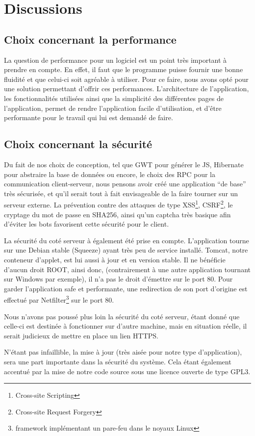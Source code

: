 \chapter{Discussions}
\section{Choix concernant la performance}
La question de performance pour un logiciel est un point très important à prendre en compte. En effet, il faut que le programme puisse fournir une bonne fluidité et que celui-ci soit agréable à utiliser. Pour ce faire, nous avons opté pour une solution permettant d'offrir ces performances. L'architecture de l'application, les fonctionnalités utilisées ainsi que la simplicité des différentes pages de l'application, permet de rendre l'application facile d'utilisation, et d'être performante pour le travail qui lui est demandé de faire.
\section{Choix concernant la sécurité}


Du fait de nos choix de conception, tel que GWT pour générer le JS, Hibernate pour abstraire la base de données ou encore, le choix des RPC pour la
 communication client-serveur, nous pensons avoir créé une application \enquote{de base} très sécurisée, et qu'il serait tout à fait envisageable de la faire tourner sur un serveur externe.
La prévention contre des attaques de type XSS\footnote{Cross-site Scripting}, CSRF\footnote{Cross-site Request Forgery}, le cryptage du mot de passe en SHA256, ainsi qu'un captcha très basique afin d'éviter les bots favorisent cette sécurité pour le client.


La sécurité du coté serveur à également été prise en compte. L'application tourne sur une Debian stable (Squeeze) ayant très peu de service installé. Tomcat, notre conteneur d'applet, est lui aussi à jour et en version stable. Il ne bénéficie d'aucun droit ROOT, ainsi donc, (contrairement à une autre application tournant sur Windows par exemple), il n'a pas le droit d'émettre sur le port 80. Pour garder l'application safe et performante, une redirection de son port d'origine est effectué par Netfilter\footnote{framework implémentant un pare-feu dans le noyaux Linux} sur le port 80.

Nous n'avons pas poussé plus loin la sécurité du coté serveur, étant donné que celle-ci est destinée à fonctionner sur d'autre machine, mais en situation réelle, il serait judicieux de mettre en place un lien HTTPS.

N'étant pas infaillible, la mise à jour (très aisée pour notre type d'application), sera une part importante dans la sécurité du système. Cela étant également accentué par la mise de notre code source sous une licence ouverte de type GPL3.
